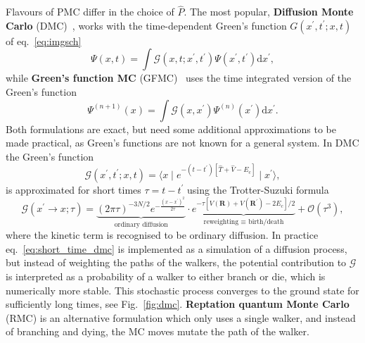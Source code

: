 Flavours of PMC differ in the choice of $\hat{P}$. The most popular, \textbf{Diffusion Monte Carlo} (DMC)~\cite{foulkes2001quantum, reynolds1990diffusion}, works with the time-dependent Green's function $G(x^\prime, t^\prime; x, t)$ of eq.~\eqref{eq:imgsch}
\begin{equation}
	\Psi(x, t)=\int \mathcal G\left(x, t; x^\prime, t^\prime\right) \Psi \left(x^{\prime}, t^\prime \right) \mathrm{d} x^{\prime},
\end{equation}
while\textbf{ Green's function MC} (GFMC)~\cite{kalos1962monte, kalos1966stochastic} uses the time integrated version of the Green's function
\begin{equation}
	\Psi^{(n+1)}(x)=\int \mathcal G\left(x, x^{\prime}\right) \Psi^{(n)}\left(x^{\prime}\right) \mathrm{d}x^\prime. 
\end{equation}
Both formulations are exact, but need some additional approximations to be made practical, as Green's functions are not known for a general system. In DMC the Green's function
\begin{equation}
	\mathcal G(x^\prime, t^\prime; x, t) = \langle x \mid e^{-(t-t^\prime) [\hat T + \hat V - E_c ] } \mid x^\prime \rangle,
\end{equation}
is approximated for short times $\tau = t-t^\prime$ using the Trotter-Suzuki formula
\begin{equation}
	\label{eq:short_time_dmc}
	\mathcal G(x^\prime \rightarrow x; \tau) = \underbrace{(2 \pi \tau)^{-3N / 2} e^{-\frac{\left(x-x^{\prime}\right)^{2}}{2 \tau}}}_{\text{ordinary diffusion}} \cdot \underbrace{e^{-\tau\left[V(\mathbf{R})+V\left(\mathbf{R}^{\prime}\right)-2 E_{c}\right] / 2}}_{\text{reweighting $\equiv$ birth/death}} + \mathcal{O}(\tau^3),
\end{equation}
where the kinetic term is recognised to be ordinary diffusion. In practice eq.~\eqref{eq:short_time_dmc} is implemented as a simulation of a diffusion process, but instead of weighting the paths of the walkers, the potential contribution to $\mathcal G$ is interpreted as a probability of a walker to either branch or die, which is numerically more stable. This stochastic process converges to the ground state for sufficiently long times, see Fig.~\ref{fig:dmc}. \textbf{Reptation quantum Monte Carlo}~\cite{reynolds1990diffusion} (RMC) is an alternative formulation which only uses a single walker, and instead of branching and dying, the MC moves mutate the path of the walker. 
